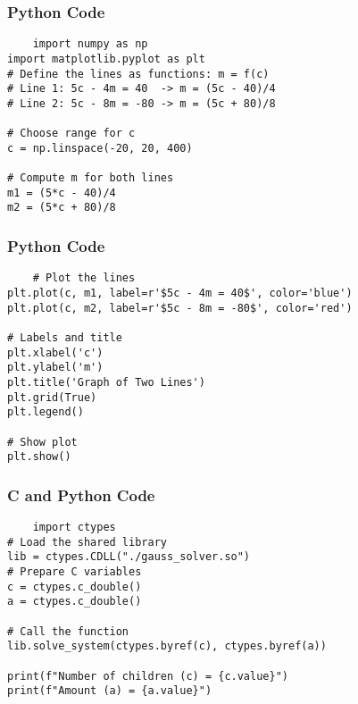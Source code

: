 \documentclass{beamer}
\begin{document}
\begin{frame}[fragile]
\frametitle{Python Code}
\begin{lstlisting}
    import numpy as np
import matplotlib.pyplot as plt
# Define the lines as functions: m = f(c)
# Line 1: 5c - 4m = 40  -> m = (5c - 40)/4
# Line 2: 5c - 8m = -80 -> m = (5c + 80)/8

# Choose range for c
c = np.linspace(-20, 20, 400)

# Compute m for both lines
m1 = (5*c - 40)/4
m2 = (5*c + 80)/8
\end{lstlisting}
\end{frame}
\begin{frame}[fragile]
\frametitle{Python Code}
\begin{lstlisting}
    # Plot the lines
plt.plot(c, m1, label=r'$5c - 4m = 40$', color='blue')
plt.plot(c, m2, label=r'$5c - 8m = -80$', color='red')

# Labels and title
plt.xlabel('c')
plt.ylabel('m')
plt.title('Graph of Two Lines')
plt.grid(True)
plt.legend()

# Show plot
plt.show()
\end{lstlisting}
\end{frame}
\begin{frame}[fragile]
\frametitle{C and Python Code}
\begin{lstlisting}
    import ctypes
# Load the shared library
lib = ctypes.CDLL("./gauss_solver.so")
# Prepare C variables
c = ctypes.c_double()
a = ctypes.c_double()

# Call the function
lib.solve_system(ctypes.byref(c), ctypes.byref(a))

print(f"Number of children (c) = {c.value}")
print(f"Amount (a) = {a.value}")
\end{lstlisting}
\end{frame}
\end{document}
